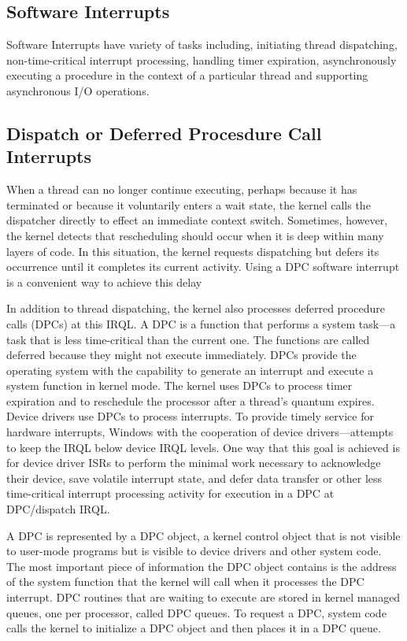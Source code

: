 \documentclass[letterpaper,10pt,draftclsnofoot,onecolumn]{IEEEtran}
\begin{document}
\subsection*{Software Interrupts}

Software Interrupts have variety of tasks including, initiating thread dispatching, non-time-critical interrupt processing, handling timer expiration, asynchronously executing a procedure in the context of a particular thread and supporting asynchronous I/O operations.

\subsection*{Dispatch or Deferred Procesdure Call Interrupts}

When a thread can no longer continue executing, perhaps because it has terminated or because it voluntarily enters a wait state, the kernel calls the dispatcher directly to effect an immediate context switch. Sometimes, however, the kernel detects that rescheduling should occur when it is deep within many layers of code. In this situation, the kernel requests dispatching but defers its occurrence until it completes its current activity. Using a DPC software interrupt is a convenient way to achieve this delay

In addition to thread dispatching, the kernel also processes deferred procedure calls (DPCs) at this IRQL. A DPC is a function that performs a system task—a task that is less time-critical than the current one. The functions are called deferred because they might not execute immediately. DPCs provide the operating system with the capability to generate an interrupt and execute a system function in kernel mode. The kernel uses DPCs to process timer expiration and to reschedule the processor after a thread’s quantum expires. Device drivers use DPCs to process interrupts. To provide timely service for hardware interrupts, Windows with the cooperation of device drivers—attempts to keep the IRQL below device IRQL levels. One way that this goal is achieved is for device driver ISRs to perform the minimal work necessary to acknowledge their device, save volatile interrupt state, and defer data transfer or other less time-critical interrupt processing activity for execution in a DPC at DPC/dispatch IRQL.

A DPC is represented by a DPC object, a kernel control object that is not visible to user-mode programs but is visible to device drivers and other system code. The most important piece of information the DPC object contains is the address of the system function that the kernel will call when it processes the DPC interrupt. DPC routines that are waiting to execute are stored in kernel managed queues, one per processor, called DPC queues. To request a DPC, system code calls the kernel to initialize a DPC object and then places it in a DPC queue.\cite{[1]}
\end{document}
